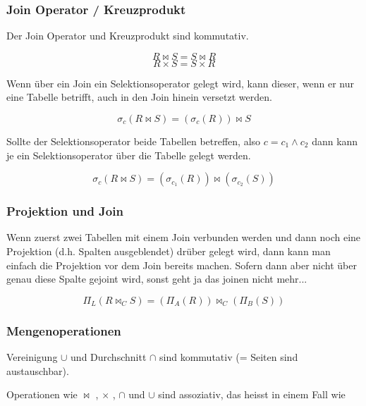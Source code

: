 \subsubsection{Join Operator / Kreuzprodukt}
Der Join Operator und Kreuzprodukt sind kommutativ.

\begin{equation*}
  R \bowtie S = S \bowtie R
\end{equation*}
\begin{equation*}
  R \times S = S \times R
\end{equation*}

Wenn über ein Join ein Selektionsoperator gelegt wird, kann dieser, wenn er nur eine Tabelle betrifft, auch in den Join hinein versetzt werden.

\begin{equation}
  \sigma _c (R \bowtie S) =  (\sigma _c  (R))\bowtie S
\end{equation}

Sollte der Selektionsoperator beide Tabellen betreffen, also \(c = c_1 \wedge c_2\) dann kann je ein Selektionsoperator über die Tabelle gelegt werden.

\begin{equation}
  \sigma _c (R\bowtie S) = (\sigma _ {c_1} (R)) \bowtie (\sigma _ {c_2} (S))
\end{equation}

\subsubsection{Projektion und Join}
Wenn zuerst zwei Tabellen mit einem Join verbunden werden und dann noch eine Projektion (d.h. Spalten ausgeblendet) drüber gelegt wird, dann kann man einfach die Projektion vor dem Join bereits machen. Sofern dann aber nicht über genau diese Spalte gejoint wird, sonst geht ja das joinen nicht mehr...

\begin{equation}
  \Pi _{L} (R \bowtie _C S) = (\Pi _{A} (R)) \bowtie _C (\Pi _B (S))
\end{equation}

\subsubsection{Mengenoperationen}
Vereinigung \(\cup\) und Durchschnitt \(\cap\) sind kommutativ (= Seiten sind austauschbar).

Operationen wie \(\bowtie\) , \(\times\) , \(\cap\) und \(\cup\) sind assoziativ, das heisst in einem Fall wie

